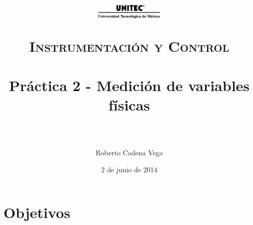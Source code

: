 



\title{	
	\normalfont \normalsize
	\begin{figure}[h]
		\begin{center}
			\includegraphics[width=0.3\textwidth]{../images/UNITEC.png} %
		\end{center}
	\end{figure}
	\textsc{Instrumentación y Control} \\ [25pt]
	\horrule{0.5pt} \\[0.4cm] %
	\huge Práctica 2 - Medición de variables físicas \\ %
	\horrule{2pt} \\[0.5cm] %
}

\author{Roberto Cadena Vega} %

\date{\normalsize 2 de junio de 2014} %




\maketitle %


\section{Objetivos}

